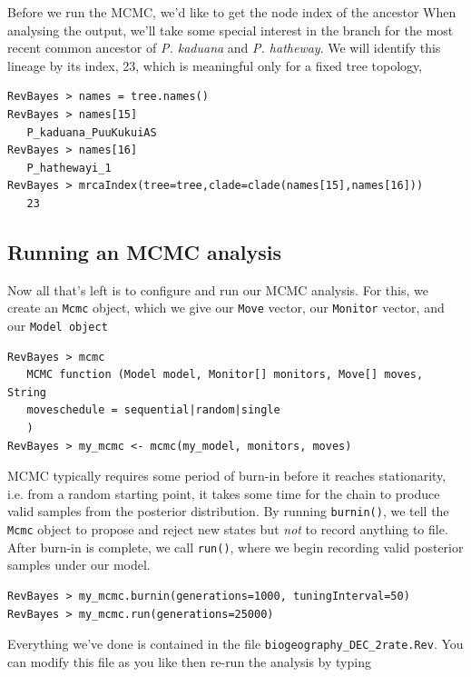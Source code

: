 \documentclass[11pt]{article}
\begin{document}
Before we run the MCMC, we'd like to get the node index of the ancestor 
When analysing the output, we'll take some special interest in the branch for the most recent common ancestor of {\it P. kaduana} and {\it P. hatheway}.
We will identify this lineage by its index, 23, which is meaningful only for a fixed tree topology,
\begin{snugshade}
\begin{lstlisting}
RevBayes > names = tree.names()
RevBayes > names[15]
   P_kaduana_PuuKukuiAS
RevBayes > names[16]
   P_hathewayi_1
RevBayes > mrcaIndex(tree=tree,clade=clade(names[15],names[16]))
   23
\end{lstlisting}
\end{snugshade}


\subsection{Running an MCMC analysis}

Now all that's left is to configure and run our MCMC analysis.
For this, we create an {\tt Mcmc} object, which we give our {\tt Move} vector, our {\tt Monitor} vector, and our {\tt Model object}

\begin{snugshade}
\begin{lstlisting}
RevBayes > mcmc
   MCMC function (Model model, Monitor[] monitors, Move[] moves, String
   moveschedule = sequential|random|single
   )
RevBayes > my_mcmc <- mcmc(my_model, monitors, moves)
\end{lstlisting}
\end{snugshade}

MCMC typically requires some period of burn-in before it reaches stationarity, i.e. from a random starting point, it takes some time for the chain to produce valid samples from the posterior distribution.
By running {\tt burnin()}, we tell the {\tt Mcmc} object to propose and reject new states but {\it not} to record anything to file.
After burn-in is complete, we call {\tt run()}, where we begin recording valid posterior samples under our model.

\begin{snugshade}
\begin{lstlisting}
RevBayes > my_mcmc.burnin(generations=1000, tuningInterval=50)
RevBayes > my_mcmc.run(generations=25000)
\end{lstlisting}
\end{snugshade}

Everything we've done is contained in the file {\tt biogeography\_DEC\_2rate.Rev}.
You can modify this file as you like then re-run the analysis by typing
\end{document}
